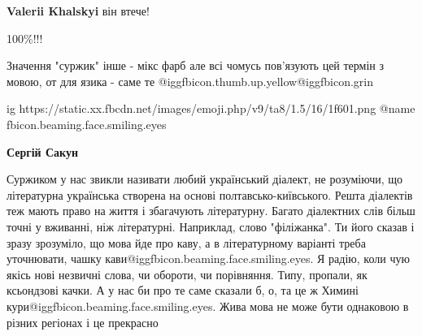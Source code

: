 \begin{itemize}
\begin{itemize}
\textbf{Valerii Khalskyi} він втече!
\end{itemize}

 
100\%!!!

 
Значення "суржик" інше - мікс фарб але всі чомусь пов'язують цей термін з мовою, от для язика - саме те 
@igg{fbicon.thumb.up.yellow}@igg{fbicon.grin}

\ifcmt
  ig https://static.xx.fbcdn.net/images/emoji.php/v9/ta8/1.5/16/1f601.png
	@name fbicon.beaming.face.smiling.eyes
\fi

\begin{itemize}
 
\textbf{Сергій Сакун}

Суржиком у нас звикли називати любий український діалект, не розуміючи, що
літературна українська створена на основі полтавсько-київського. Решта
діалектів теж мають право на життя і збагачують літературну. Багато діалектних
слів більш точні у вживанні, ніж літературні. Наприклад, слово "філіжанка". Ти
його сказав і зразу зрозуміло, що мова йде про каву, а в літературному варіанті
треба уточнювати, чашку кави@igg{fbicon.beaming.face.smiling.eyes}. Я радію, коли чую якісь нові незвичні слова, чи
обороти, чи порівняння. Типу, пропали, як ксьондзові качки. А у нас би про те
саме сказали б, о, та це ж Химині кури@igg{fbicon.beaming.face.smiling.eyes}. Жива мова не може бути однаковою в
різних регіонах і це прекрасно

 

\end{itemize}
\end{itemize}
